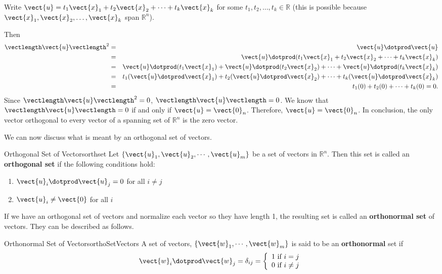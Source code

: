 \begin{solution}
Write $\vect{u}=t_1\vect{x}_1 + t_2\vect{x}_2 +\cdots +t_k\vect{x}_k$
for some $t_1, t_2, \ldots, t_k\in\mathbb{R}$
(this is possible because
$\vect{x}_1, \vect{x}_2, \ldots, \vect{x}_k$ span $\mathbb{R}^n$).
 
Then
\begin{eqnarray*}
\vectlength\vect{u}\vectlength^2 & = & \vect{u}\dotprod\vect{u} \\
& = & \vect{u}\dotprod(t_1\vect{x}_1 + t_2\vect{x}_2 +\cdots +t_k\vect{x}_k) \\
& = & \vect{u}\dotprod (t_1\vect{x}_1) +  \vect{u}\dotprod (t_2\vect{x}_2) +
\cdots +  \vect{u}\dotprod (t_k\vect{x}_k) \\
& = & t_1(\vect{u}\dotprod \vect{x}_1) + t_2(\vect{u}\dotprod \vect{x}_2) + \cdots 
+ t_k(\vect{u}\dotprod \vect{x}_k) \\
& = & t_1(0) + t_2(0) + \cdots + t_k(0) = 0.
\end{eqnarray*}
Since $\vectlength\vect{u}\vectlength^2 =0$, $\vectlength\vect{u}\vectlength =0$.
We know that $\vectlength\vect{u}\vectlength=0$ if and only if 
$\vect{u}=\vect{0}_n$.
Therefore, $\vect{u}=\vect{0}_n$.
In conclusion, the only vector orthogonal to every vector of
a spanning set of $\mathbb{R}^n$ is the zero vector.
\end{solution}

We can now discuss what is meant by an orthogonal set of vectors. 

\begin{definition}{Orthogonal Set of Vectors}{orthset}
Let $\{ \vect{u}_1, \vect{u}_2, \cdots, \vect{u}_m \}$ be a set of
vectors in $\mathbb{R}^n$. Then this set is called an
\textbf{orthogonal set}
if the following conditions hold:
\begin{enumerate}
\item 
$\vect{u}_i \dotprod \vect{u}_j = 0$ for all $i \neq j$ 
\item
$\vect{u}_i \neq \vect{0}$ for all $i$
\end{enumerate}
\end{definition}

If we have an orthogonal set of vectors and normalize each vector so
they have length 1, the resulting set is called an \textbf{orthonormal
set} of vectors. They can be described as follows.

\begin{definition}{Orthonormal Set of Vectors}{orthoSetVectors}
A set of vectors, $\left\{ \vect{w}_{1},\cdots ,\vect{w}_{m}\right\} $
is said to be an
\textbf{orthonormal}
set if 
\[
\vect{w}_i \dotprod \vect{w}_j = \delta _{ij} = \left\{ 
\begin{array}{c}
1\text{ if }i=j \\ 
0\text{ if }i\neq j
\end{array}
\right.
\]
\end{definition}

